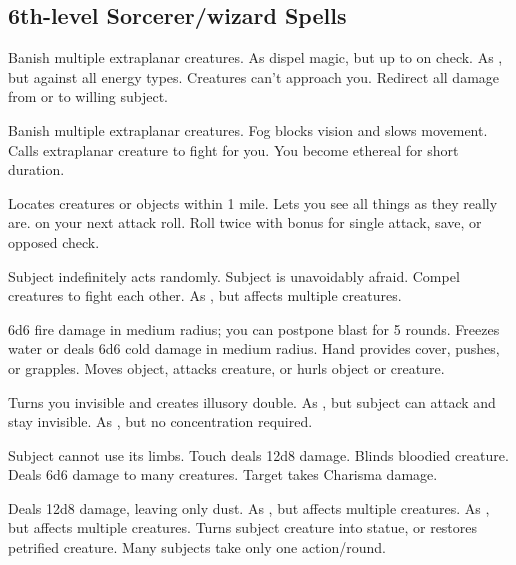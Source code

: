 
\subsection{6th-level Sorcerer/wizard Spells} 
\begin{swspelllist}
   Banish multiple extraplanar creatures. 
   As dispel magic, but up to  on check.
   As , but against all energy types.
   Creatures can't approach you.
   Redirect all damage from or to willing subject.

   Banish multiple extraplanar creatures. 
   Fog blocks vision and slows movement.
   Calls extraplanar creature to fight for you.
   You become ethereal for short duration.

   Locates creatures or objects within 1 mile.
  \M Lets you see all things as they really are.
    on your next attack roll.
   Roll twice with bonus for single attack, save, or opposed check.

   Subject indefinitely acts randomly.
   Subject is unavoidably afraid.
   Compel creatures to fight each other.
   As , but affects multiple creatures.

   6d6 fire damage in medium radius; you can postpone blast for 5 rounds.
   Freezes water or deals 6d6 cold damage in medium radius.
   Hand provides cover, pushes, or grapples.
   Moves object, attacks creature, or hurls object or creature.

   Turns you invisible and creates illusory double.
   As , but subject can attack and stay invisible.
   As , but no concentration required.

   Subject cannot use its limbs. 
   Touch deals 12d8 damage.
   Blinds bloodied creature.
   Deals 6d6 damage to many creatures.
   Target takes Charisma damage.

   Deals 12d8 damage, leaving only dust.
   As , but affects multiple creatures.
   As , but affects multiple creatures.
   Turns subject creature into statue, or restores petrified creature.
   Many subjects take only one action/round.
\end{swspelllist}

